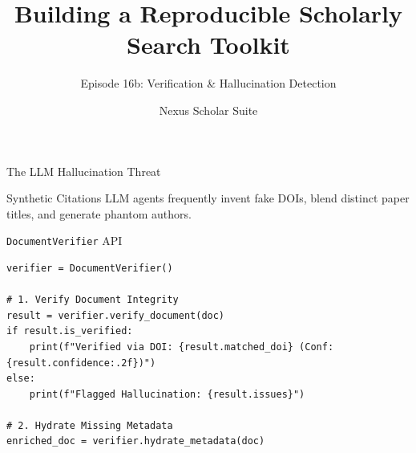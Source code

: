 \documentclass[aspectratio=169]{beamer}
\title{Building a Reproducible Scholarly Search Toolkit}
\subtitle{Episode 16b: Verification \& Hallucination Detection}
\author{Nexus Scholar Suite}
\date{}
\begin{document}
\begin{frame}[plain]
  \titlepage
\end{frame}

\begin{frame}{The LLM Hallucination Threat}
  \begin{alertblock}{Synthetic Citations}
    LLM agents frequently invent fake DOIs, blend distinct paper titles, and generate phantom authors.
  \end{alertblock}
  \vspace{0.3cm}
  \begin{center}
  \end{center}
\end{frame}

\begin{frame}[fragile]{\texttt{DocumentVerifier} API}
\begin{lstlisting}[style=nexuspython]
verifier = DocumentVerifier()

# 1. Verify Document Integrity
result = verifier.verify_document(doc)
if result.is_verified:
    print(f"Verified via DOI: {result.matched_doi} (Conf: {result.confidence:.2f})")
else:
    print(f"Flagged Hallucination: {result.issues}")

# 2. Hydrate Missing Metadata
enriched_doc = verifier.hydrate_metadata(doc)
\end{lstlisting}
\end{frame}
\end{document}

